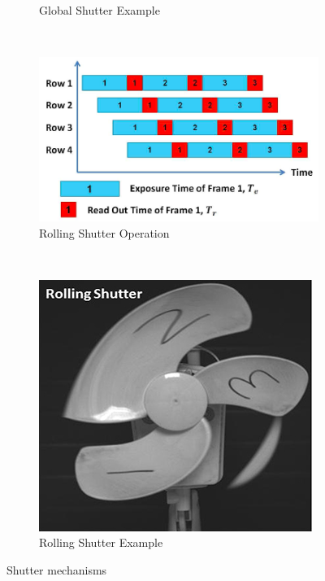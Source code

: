 \begin{figure}[!t]
\begin{subfigure}[h]{0.15\textwidth}
		\caption{Global Shutter Example}
	\end{subfigure}
	\\
	\begin{subfigure}[h]{0.3\textwidth}
		\includegraphics[width=\textwidth]{fig/rolling_shutter.png}
		\caption{Rolling Shutter Operation}
	\end{subfigure}
	~
	\begin{subfigure}[h]{0.15\textwidth}
		\includegraphics[width=\textwidth]{fig/fan_rolling}
		\caption{Rolling Shutter Example}
	\end{subfigure}
\caption{Shutter mechanisms}
\label{fig:compare_shutter}
\end{figure}

